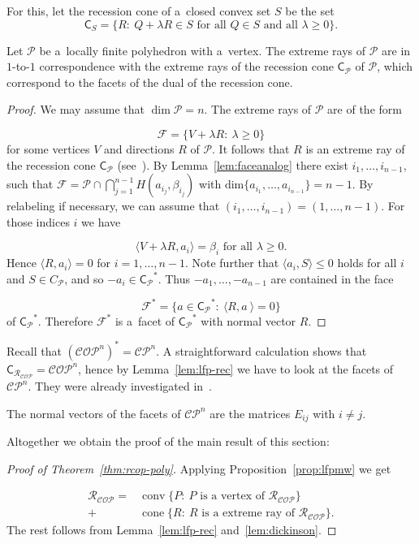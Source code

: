 \documentclass{commat}
\newcommand{\sR}{\mathcal{R}}
\DeclareMathOperator{\cone}{cone}
\DeclareMathOperator{\conv}{conv}
\newcommand{\cop}{{\mathcal{COP}}}
\newcommand{\copn}{{\mathcal{COP}}^{n}}
\newcommand{\cpn}{{\mathcal{CP}}^{n}}
\newcommand{\lfp}{\mathcal{P}}
\newcommand{\lfpfacef}{\mathcal{F}}
\begin{document}
For this, let the recession cone of a~closed convex set $S$ be the set
\[
	\mathsf{C}_S = \big\{ R :\ Q+\lambda R \in S \text{ for all } Q \in S
        \text{ and all } \lambda\geq0
                   \big\}.
\]
\begin{lemma}\label{lem:lfp-rec}
	Let \(\lfp \) be a~locally finite polyhedron with a~vertex.
	The extreme rays of \(\lfp \) are in $1$-to-$1$ correspondence with the extreme rays of the
	recession cone \(\mathsf{C}_\lfp \) of \(\lfp \), which correspond to the facets of the dual
	of the recession cone.
\end{lemma}
\begin{proof}
    We may assume that \(\dim\lfp=n \).
	The extreme rays of \(\lfp \) are of the form
	
\[
		\lfpfacef=\big\{ V+\lambda R :\ \lambda\geq0 \big\}
\]
	for some vertices $V$ and directions $R$ of \(\lfp \).
	It follows that $R$ is an extreme ray of the recession cone \(\mathsf{C}_\lfp \) (see~\cite[p. 163]{rockafellar-1970}).
	By Lemma~\ref{lem:faceanalog} there exist \(i_1,\dots,i_{n-1} \), such that
	\(\lfpfacef=\lfp\cap\bigcap_{j=1}^{n-1}H(a_{i_j},\beta_{i_j}) \) with
	\(\text{dim}\{ a_{i_1},\dots,a_{i_{n-1}} \}=n-1 \).
	By relabeling if necessary, we can assume that \((i_1, \dots, i_{n-1})=(1,\dots,n-1) \).
	For those indices $i$ we have
	
\[
		\langle V+\lambda R, a_i \rangle = \beta_i \text{ for all } \lambda\geq0.
\]
	Hence \(\langle R, a_i \rangle = 0 \) for \(i=1, \dots, n-1 \).
	Note further that \(\langle a_i,S \rangle \leq 0 \) holds for all $i$ and \(S\in C_\lfp \),
	and so \(-a_i\in{\mathsf{C}_\lfp}^* \).
    Thus \(-a_1, \dots, -a_{n-1} \) are contained in the face
	
\[
		\lfpfacef^* =\{ a\in {\mathsf{C}_\lfp}^* :\ \langle R, a~\rangle=0 \}
\]
	of \({\mathsf{C}_\lfp}^* \).
	Therefore \(\lfpfacef^* \) is a~facet of \({\mathsf{C}_\lfp}^* \) with normal vector $R$.
\end{proof}
Recall that \({(\copn)}^* = \cpn \).
A straightforward calculation shows that \(\mathsf{C}_{\sR_\cop} = \copn \),
hence by Lemma~\ref{lem:lfp-rec} we have to look at the facets of \(\cpn \).
They were already investigated in~\cite{dickinson-2013a}.
\begin{lemma}\label{lem:dickinson}
    The normal vectors of the facets of \(\cpn \) are the matrices \(E_{ij} \) with \(i\neq j \).
\end{lemma}
Altogether we obtain the proof of the main result of this section:
\begin{proof}[Proof of Theorem~\ref{thm:rcop-poly}]
	Applying Proposition~\ref{prop:lfpmw} we get
	
\begin{align*}
		\sR_\cop =& \conv\big\{ P:\ P \text{ is a~vertex of } \sR_\cop \big\} \\
				 +& \cone\big\{ R :\ R \text{ is a~extreme ray of } \sR_\cop \big\}.
\end{align*}
	The rest follows from Lemma~\ref{lem:lfp-rec} and~\ref{lem:dickinson}.
\end{proof}
\end{document}
